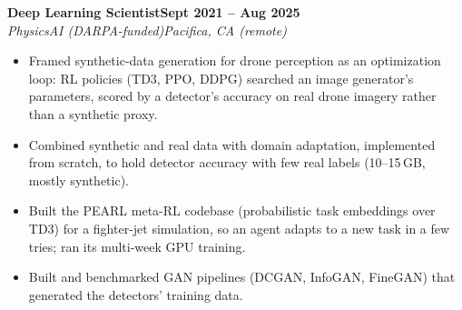 \documentclass[10pt]{article}
\newcommand{\role}[4]{\par\vspace{3pt}\textbf{#1}\hfill\textbf{#2}\\\textit{#3}\hfill\textit{#4}}
\begin{document}
\role{Deep Learning Scientist}{Sept 2021 -- Aug 2025}{PhysicsAI (DARPA-funded)}{Pacifica, CA (remote)}
\begin{itemize}
\item Framed synthetic-data generation for drone perception as an optimization loop: RL policies (TD3, PPO, DDPG) searched an image generator's parameters, scored by a detector's accuracy on real drone imagery rather than a synthetic proxy.
\item Combined synthetic and real data with domain adaptation, implemented from scratch, to hold detector accuracy with few real labels (10--15\,GB, mostly synthetic).
\item Built the PEARL meta-RL codebase (probabilistic task embeddings over TD3) for a fighter-jet simulation, so an agent adapts to a new task in a few tries; ran its multi-week GPU training.
\item Built and benchmarked GAN pipelines (DCGAN, InfoGAN, FineGAN) that generated the detectors' training data.
\end{itemize}
\end{document}
